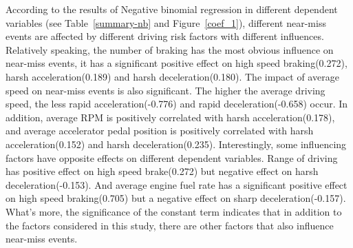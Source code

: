 \documentclass[entropy,article,submit,moreauthors,LaTeX and dvi2pdf]{Definitions/mdpi}
\begin{document}
\begin{paracol}{2}
\linenumbers
\switchcolumn
According to the results of Negative binomial regression in different dependent variables (see Table~\ref{summary-nb} and Figure~\ref{coef_1}), different near-miss events are affected by different driving risk factors with different influences. Relatively speaking, the number of braking has the most obvious influence on near-miss events, it has a significant positive effect on high speed braking(0.272), harsh acceleration(0.189) and harsh deceleration(0.180). The impact of average speed on near-miss events is also significant. The higher the average driving speed, the less rapid acceleration(-0.776) and rapid deceleration(-0.658) occur. In addition, average RPM is positively correlated with harsh acceleration(0.178), and average accelerator pedal position is positively correlated with harsh acceleration(0.152) and harsh deceleration(0.235). Interestingly, some influencing factors have opposite effects on different dependent variables. Range of driving has positive effect on high speed brake(0.272) but negative effect on harsh deceleration(-0.153). And average engine fuel rate has a significant positive effect on high speed braking(0.705) but a negative effect on sharp deceleration(-0.157). What's more, the significance of the constant term indicates that in addition to the factors considered in this study, there are other factors that also influence near-miss events.
\end{paracol}
\end{document}
